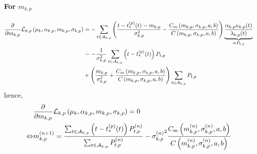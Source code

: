 \paragraph{For $m_{k,p}$}
\begin{equation}
\begin{split}
    \frac{\partial^{}}{\partial {m_{k,p}}^{}}\mathcal{L}_{k,p}\left( \mu_k, \alpha_{k,p}, m_{k,p}, \sigma_{k,p} \right) &= -\sum_{t\in\mathcal{A}_{k,p}} \left( \frac{t - t_*^{(p)}(t) - m_{k,p}}{\sigma_{k,p}^2} - \frac{C_m\left( m_{k,p}, \sigma_{k,p},a,b \right)}{C\left( m_{k,p}, \sigma_{k,p},a,b \right)} \right)\underbrace{\frac{\alpha_{k,p}\kappa_{k,p}(t)}{\lambda_{k,p}(t)}}_{=P_{t,p}} \\
    &= -\frac{1}{\sigma_{k,p}^2} \sum_{t\in\mathcal{A}_{k,p}} \left( t - t_*^{(p)}(t) \right) P_{t,p} \\
    &+ \left( \frac{m_{k,p}}{\sigma_{k,p}^2} + \frac{C_m\left( m_{k,p}, \sigma_{k,p},a,b \right)}{C\left( m_{k,p}, \sigma_{k,p},a,b \right)} \right) \sum_{t\in\mathcal{A}_{k,p}} P_{t,p}
\end{split}
\end{equation}
hence,
\begin{equation}
\begin{split}
    &\frac{\partial^{}}{\partial {m_{k,p}}^{}}\mathcal{L}_{k,p}\left( \mu_k, \alpha_{k,p}, m_{k,p}, \sigma_{k,p} \right) = 0 \\
    \Leftrightarrow &m_{k,p}^{(n+1)} = \frac{\sum_{t\in\mathcal{A}_{k,p}} \left( t - t_*^{(p)}(t) \right) P_{t,p}^{(n)}}{\sum_{t\in\mathcal{A}_{k,p}} P_{t,p}^{(n)}} - {\sigma_{k,p}^{(n)}}^2 \frac{C_m\left( m_{k,p}^{(n)}, \sigma_{k,p}^{(n)},a,b \right)}{C\left( m_{k,p}^{(n)}, \sigma_{k,p}^{(n)},a,b \right)}
\end{split}
\end{equation}

